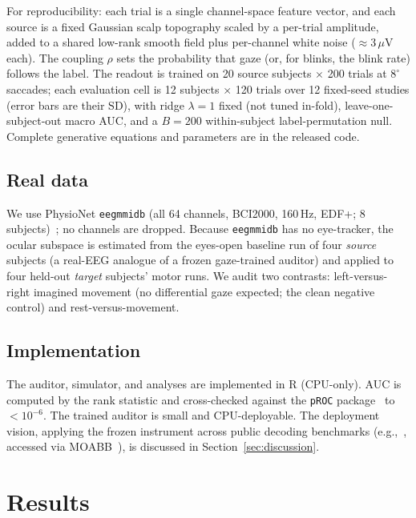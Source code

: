 \documentclass[conference]{IEEEtran}
\begin{document}
For reproducibility: each trial is a single channel-space feature vector, and each source is a
fixed Gaussian scalp topography scaled by a per-trial amplitude, added to a shared low-rank
smooth field plus per-channel white noise ($\approx 3\,\mu$V each). The coupling $\rho$ sets the
probability that gaze (or, for blinks, the blink rate) follows the label. The readout is trained
on 20 source subjects $\times$ 200 trials at $8^\circ$ saccades; each evaluation cell is 12
subjects $\times$ 120 trials over 12 fixed-seed studies (error bars are their SD), with ridge
$\lambda{=}1$ fixed (not tuned in-fold), leave-one-subject-out macro AUC, and a $B{=}200$
within-subject label-permutation null. Complete generative equations and parameters are in the
released code.

\subsection{Real data}

We use PhysioNet \texttt{eegmmidb} (all 64 channels, BCI2000, 160\,Hz, EDF+; 8
subjects)~\cite{schalk2004bci2000,goldberger2000physionet}; no channels are dropped. Because
\texttt{eegmmidb} has no eye-tracker, the ocular subspace is estimated from the eyes-open
baseline run of four \emph{source} subjects (a real-EEG analogue of a frozen gaze-trained
auditor) and applied to four held-out \emph{target} subjects' motor runs. We audit two
contrasts: left-versus-right imagined movement (no differential gaze expected; the clean
negative control) and rest-versus-movement.

\subsection{Implementation}

The auditor, simulator, and analyses are implemented in R (CPU-only). AUC is computed by the
rank statistic and cross-checked against the \texttt{pROC} package~\cite{robin2011proc} to
$<10^{-6}$. The trained auditor is small and CPU-deployable. The
deployment vision, applying the frozen instrument across public decoding benchmarks
(e.g.,~\cite{kappenman2021erpcore,gifford2022thingseeg2,arico2014p300jitter,korczowski2019bi2015a},
accessed via MOABB~\cite{jayaram2018moabb,tangermann2012bcicompetitioniv}), is discussed in
Section~\ref{sec:discussion}.

\section{Results}
\end{document}
